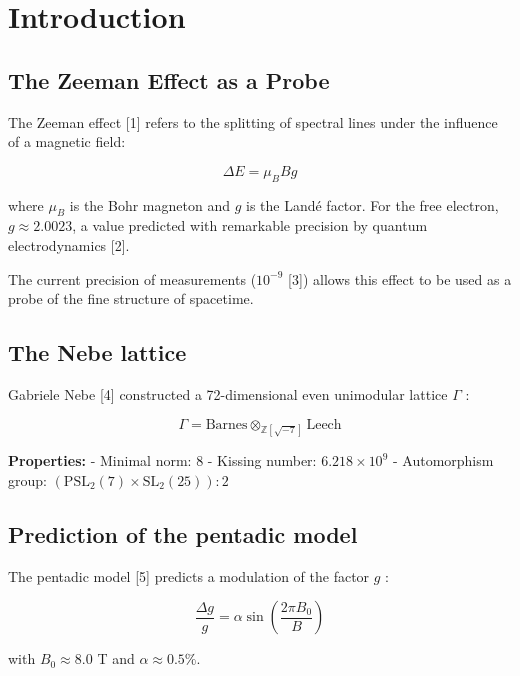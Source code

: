 \documentclass[11pt]{article}
\begin{document}
\hypertarget{introduction-1}{%
\section{Introduction}\label{introduction-1}}

\hypertarget{the-zeeman-effect-as-a-probe}{%
\subsection{The Zeeman Effect as a
Probe}\label{the-zeeman-effect-as-a-probe}}

The Zeeman effect {[}1{]} refers to the splitting of spectral lines
under the influence of a magnetic field:

\[\Delta E = \mu_B B g\]

where \(\mu_B\) is the Bohr magneton and \(g\) is the Landé factor. For
the free electron, \(g \approx 2.0023\), a value predicted with
remarkable precision by quantum electrodynamics {[}2{]}.

The current precision of measurements (\(10^{-9}\) {[}3{]}) allows this
effect to be used as a probe of the fine structure of spacetime.

\hypertarget{the-nebe-lattice}{%
\subsection{The Nebe lattice}\label{the-nebe-lattice}}

Gabriele Nebe {[}4{]} constructed a 72-dimensional even unimodular
lattice \(\Gamma\) :

\[\Gamma = \text{Barnes} \otimes_{\mathbb{Z}[\sqrt{-7}]} \text{Leech}\]

\textbf{Properties:} - Minimal norm: 8 - Kissing number:
\(6.218\times10^9\) - Automorphism group:
\((\text{PSL}_2(7) \times \text{SL}_2(25)):2\)

\hypertarget{prediction-of-the-pentadic-model}{%
\subsection{Prediction of the pentadic
model}\label{prediction-of-the-pentadic-model}}

The pentadic model {[}5{]} predicts a modulation of the factor \(g\) :

\[\frac{\Delta g}{g} = \alpha \sin\left(\frac{2\pi B_0}{B}\right)\]

with \(B_0 \approx 8.0\) T and \(\alpha \approx 0.5\%\).
\end{document}
